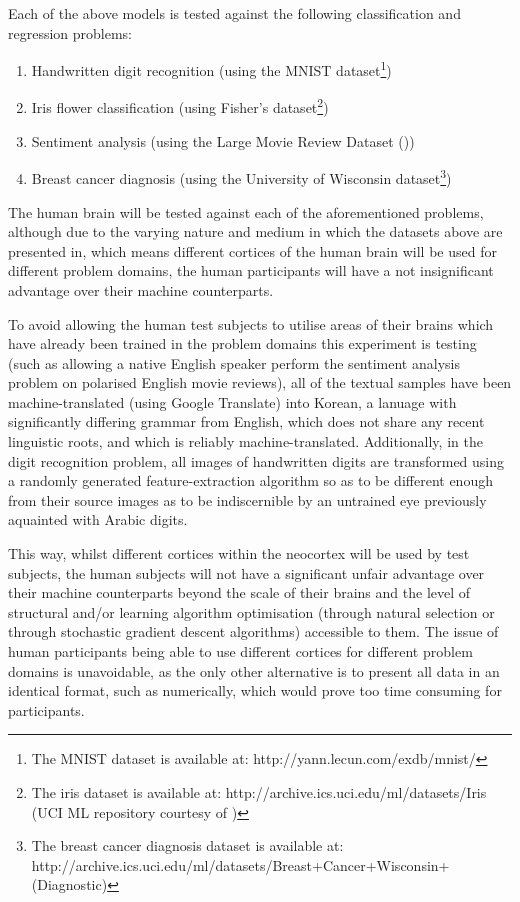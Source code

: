 \documentclass[]{report}
\begin{document}
Each of the above models is tested against the following classification and regression problems:

\begin{enumerate}
	\item Handwritten digit recognition (using the MNIST dataset\footnote{The MNIST dataset is available at: http://yann.lecun.com/exdb/mnist/})
	\item Iris flower classification (using Fisher's dataset\footnote{The iris dataset is available at: http://archive.ics.uci.edu/ml/datasets/Iris (UCI ML repository courtesy of \cite{uciml2007})})
	\item Sentiment analysis (using the Large Movie Review Dataset (\cite{maas2011imdb}))
	\item Breast cancer diagnosis (using the University of Wisconsin dataset\footnote{The breast cancer diagnosis dataset is available at: http://archive.ics.uci.edu/ml/datasets/Breast+Cancer+Wisconsin+(Diagnostic)})
\end{enumerate}

The human brain will be tested against each of the aforementioned problems, although due to the varying nature and medium in which the datasets above are presented in, which means different cortices of the human brain will be used for different problem domains, the human participants will have a not insignificant advantage over their machine counterparts.

To avoid allowing the human test subjects to utilise areas of their brains which have already been trained in the problem domains this experiment is testing (such as allowing a native English speaker perform the sentiment analysis problem on polarised English movie reviews), all of the textual samples have been machine-translated (using Google Translate) into Korean, a lanuage with significantly differing grammar from English, which does not share any recent linguistic roots, and which is reliably machine-translated. Additionally, in the digit recognition problem, all images of handwritten digits are transformed using a randomly generated feature-extraction algorithm so as to be different enough from their source images as to be indiscernible by an untrained eye previously aquainted with Arabic digits.

This way, whilst different cortices within the neocortex will be used by test subjects, the human subjects will not have a significant unfair advantage over their machine counterparts beyond the scale of their brains and the level of structural and/or learning algorithm optimisation (through natural selection or through stochastic gradient descent algorithms) accessible to them. The issue of human participants being able to use different cortices for different problem domains is unavoidable, as the only other alternative is to present all data in an identical format, such as numerically, which would prove too time consuming for participants.
\end{document}
